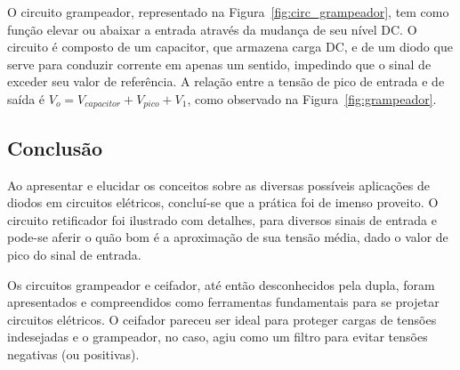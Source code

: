 \documentclass[12pt,a4paper]{article}
\begin{document}
O circuito grampeador, representado na Figura~\ref{fig:circ_grampeador}, tem como função elevar ou abaixar a entrada através da mudança de seu nível DC. O circuito é composto de um capacitor, que armazena carga DC, e de um  diodo que serve para conduzir corrente em apenas um sentido, impedindo que o sinal de exceder seu valor de referência. A relação entre a tensão de pico de entrada e de saída é $V_o=V_{capacitor}+V_{pico}+V_1$, como observado na Figura~\ref{fig:grampeador}.
\newpage
\subsection{Conclusão}
Ao apresentar e elucidar os conceitos sobre as diversas possíveis aplicações de diodos em circuitos elétricos, concluí-se que a prática foi de imenso proveito. O circuito retificador foi ilustrado com detalhes, para diversos sinais de entrada e pode-se aferir o quão bom é a aproximação de sua tensão média, dado o valor de pico do sinal de entrada. 

Os circuitos grampeador e ceifador,  até então desconhecidos pela dupla, foram apresentados e compreendidos como ferramentas fundamentais para se projetar circuitos elétricos. O ceifador pareceu ser ideal para proteger cargas de tensões indesejadas e o grampeador, no caso, agiu como um filtro para evitar tensões negativas (ou positivas).
\end{document}
